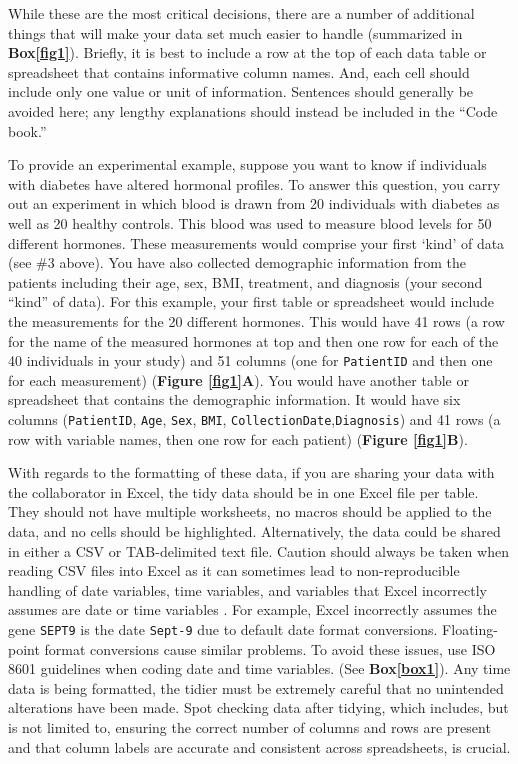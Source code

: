 \documentclass[12pt]{article}
\begin{document}
While these are the most critical decisions, there are a number of
additional things that will make your data set much easier to handle
\citep{_data_org} (summarized in \textbf{Box\ref{fig1}}). Briefly, it is
best to include a row at the top of each data table or spreadsheet that
contains informative column names. And, each cell should include only
one value or unit of information. Sentences should generally be avoided
here; any lengthy explanations should instead be included in the ``Code
book.''

To provide an experimental example, suppose you want to know if
individuals with diabetes have altered hormonal profiles. To answer this
question, you carry out an experiment in which blood is drawn from 20
individuals with diabetes as well as 20 healthy controls. This blood was
used to measure blood levels for 50 different hormones. These
measurements would comprise your first `kind' of data (see \#3 above).
You have also collected demographic information from the patients
including their age, sex, BMI, treatment, and diagnosis (your second
``kind'' of data). For this example, your first table or spreadsheet
would include the measurements for the 20 different hormones. This would
have 41 rows (a row for the name of the measured hormones at top and
then one row for each of the 40 individuals in your study) and 51
columns (one for \texttt{PatientID} and then one for each measurement)
(\textbf{Figure \ref{fig1}A}). You would have another table or
spreadsheet that contains the demographic information. It would have six
columns (\texttt{PatientID}, \texttt{Age}, \texttt{Sex}, \texttt{BMI},
\texttt{CollectionDate},\texttt{Diagnosis}) and 41 rows (a row with
variable names, then one row for each patient) (\textbf{Figure
\ref{fig1}B}).

With regards to the formatting of these data, if you are sharing your
data with the collaborator in Excel, the tidy data should be in one
Excel file per table. They should not have multiple worksheets, no
macros should be applied to the data, and no cells should be
highlighted. Alternatively, the data could be shared in either a CSV or
TAB-delimited text file. Caution should always be taken when reading CSV
files into Excel as it can sometimes lead to non-reproducible handling
of date variables, time variables, and variables that Excel incorrectly
assumes are date or time variables \citep{zeeberg_mistaken_2004}. For
example, Excel incorrectly assumes the gene \texttt{SEPT9} is the date
\texttt{Sept-9} due to default date format conversions. Floating-point
format conversions cause similar problems. To avoid these issues, use
ISO 8601 \citep{newman_date_nodate} guidelines when coding date and time
variables. (See \textbf{Box\ref{box1}}). Any time data is being
formatted, the tidier must be extremely careful that no unintended
alterations have been made. Spot checking data after tidying, which
includes, but is not limited to, ensuring the correct number of columns
and rows are present and that column labels are accurate and consistent
across spreadsheets, is crucial.
\end{document}
